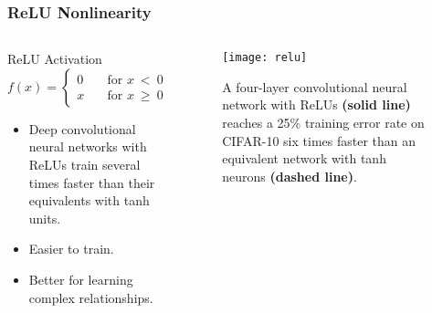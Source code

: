 \documentclass[aspectratio=169, 10pt]{beamer}
\begin{document}
\begin{frame}
	\frametitle{ReLU Nonlinearity}
	\begin{columns}
		\begin{column}{0.5\textwidth}
			\begin{block}{ReLU Activation} 
				\[ f(x) =
  				\begin{cases}
    			0       & \quad \text{for } x\ <\ 0\\
    			x  & \quad \text{for } x\ \geq\ 0
  				\end{cases}
				\]
			\end{block}
			
			\begin{itemize}
				\item Deep convolutional neural networks with ReLUs train several times faster than their
equivalents with tanh units.
				\item Easier to train.
				\item Better for learning complex relationships.
			\end{itemize}
			
		\end{column}
		
		\begin{column}{0.5\textwidth}
			\begin{figure}
				\begin{center}
					\texttt{[image: relu]}
					\caption{A four-layer convolutional neural
network with ReLUs \textbf{(solid line)} reaches a 25\%
training error rate on CIFAR-10 six times faster
than an equivalent network with tanh neurons
\textbf{(dashed line)}.}
				\end{center}
			\end{figure}
		\end{column}
		
	\end{columns}
				
\end{frame}
\end{document}
